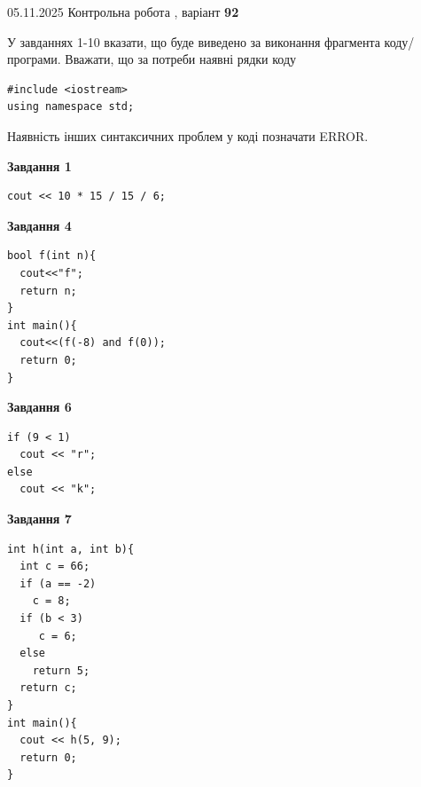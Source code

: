 \documentclass[12pt, ukrainian]{article}
\begin{document}
{\Large{05.11.2025 Контрольна робота , варіант  \No \textbf { 92 }\par}}
{
\begin {large}
У завданнях 1-10 вказати, що буде виведено за виконання фрагмента коду/про\-гра\-ми.
Вважати, що за потреби наявні рядки коду
\begin{verbatim}
#include <iostream>
using namespace std;
\end{verbatim}
Наявність інших синтаксичних проблем у коді позначати ERROR.

\begin{minipage}[t]{7.0cm}

\begin{center}
\textbf{Завдання 1}
\end{center}
\vspace{-8mm}

\begin{verbatim}
cout << 10 * 15 / 15 / 6;
\end{verbatim}



\begin{center}
\textbf{Завдання 4}
\end{center}
\vspace{-8mm}

\begin{verbatim}
bool f(int n){
  cout<<"f";
  return n;
}
int main(){
  cout<<(f(-8) and f(0));
  return 0;
}
\end{verbatim}



\begin{center}
\textbf{Завдання 6}
\end{center}
\vspace{-8mm}

\begin{verbatim}
if (9 < 1)
  cout << "r";
else
  cout << "k";
\end{verbatim}



\begin{center}
\textbf{Завдання 7}
\end{center}
\vspace{-8mm}

\begin{verbatim}
int h(int a, int b){
  int c = 66;
  if (a == -2)
    c = 8;
  if (b < 3)
     c = 6;
  else
    return 5;
  return c;
}
int main(){
  cout << h(5, 9);
  return 0;
}
\end{verbatim}


\end{minipage}
\end{large}}
\end{document}
